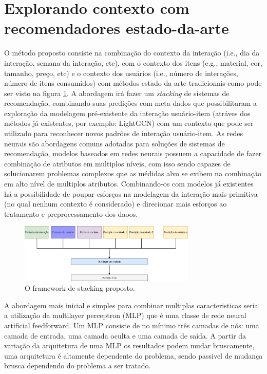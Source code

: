 \documentclass[sigconf]{acmart}
\begin{document}
\section{Explorando contexto com recomendadores estado-da-arte}

O método proposto consiste na combinação do contexto da interação (i.e., dia da interação, semana da interação, etc), com o contexto dos itens (e.g., material, cor, tamanho, preço, etc) e o contexto dos usuários (i.e., número de interações, número de itens consumidos) com métodos estado-da-arte tradicionais como pode ser visto na figura \ref{fig:model}. A abordagem irá fazer um \textit{stacking} de sistemas de recomendação, combinando suas predições com meta-dados que possibilitaram a exploração da modelagem pré-existente da interação usuário-item (atráves dos métodos já existentes, por exemplo: LightGCN) com um contexto que pode ser utilizado para reconhecer novos padrões de interação usuário-item. As redes neurais são abordagens comuns adotadas para soluções de sistemas de recomendação, modelos baseados em redes neurais possuem a capacidade de fazer combinação de atributos em multiplos níveis, com isso sendo capazes de solucionarem problemas complexos que as médidas alvo se exibem na combinação em alto nível de multiplos atributos. Combinando-os com modelos já existentes há a possibilidade de poupar esforços na modelagem da interação mais primitiva (no qual nenhum contexto é considerado) e direcionar mais esforços ao tratamento e preprocessamento dos daoos.

\begin{figure}[ht]
    \centering
    \includegraphics[width=0.75\textwidth]{./imgs/predictiondiagramdatamining.png}
    \caption{O framework de stacking proposto.}
    \label{fig:model}
\end{figure}

A abordagem mais inicial e simples para combinar multiplas caracteristicas seria a utilização da multilayer perceptron (MLP) que é uma classe de rede neural artificial feedforward. Um MLP consiste de no mínimo três camadas de nós: uma camada de entrada, uma camada oculta e uma camada de saída. A partir da variação da arquitetura de uma MLP os resultados podem mudar bruscamente, uma arquitetura é altamente dependente do problema, sendo passivel de mudança brusca dependendo do problema a ser tratado. 
\end{document}
